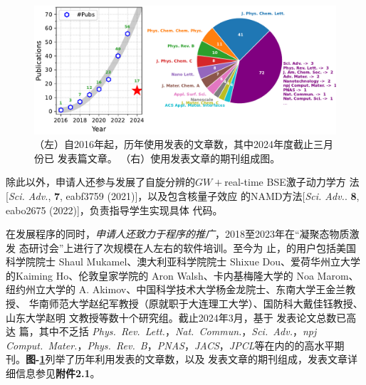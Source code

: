 
\begin{figure}
  \centering
  \includegraphics[width=1.0\linewidth]{figs/hefei-namd_pub_v3.pdf}
  \caption{\label{fig:hnamd_pub_list}
    \kaishu{}%
    （左）自2016年起，历年使用\hnamd{}发表的文章数，其中2024年度截止三月份已
    发表篇文章。
    （右）使用\hnamd{}发表文章的期刊组成图。
  }
\end{figure}


除此以外，申请人还参与发展了自旋分辨的$GW{}+{}$real-time BSE激子动力学方
法[\textit{Sci. Adv.}, \textbf{7}, eabf3759 (2021)]，以及包含核量子效应
的NAMD方法[\textit{Sci. Adv.}. \textbf{8}, eabo2675 (2022)]，负责指导学生实现具体
代码。

在发展程序的同时，\emph{申请人还致力于程序的推广}，2018至2023年在“凝聚态物质激发
态研讨会”上进行了次规模在人左右的软件培训。至今为
止，\hnamd{}的用户包括美国科学院院士 Shaul Mukamel、澳大利亚科学院院士 Shixue
Dou、爱荷华州立大学的Kaiming Ho、伦敦皇家学院的 Aron Walsh、卡内基梅隆大学的 Noa
Marom、纽约州立大学的 A. Akimov、中国科学技术大学杨金龙院士、东南大学王金兰教授、
华南师范大学赵纪军教授（原就职于大连理工大学）、国防科大戴佳钰教授、山东大学赵明
文教授等数十个研究组。截止2024年3月，基于 \hnamd{} 发表论文总数已高
达  篇，其中不乏括 \textit{Phys.\ Rev.\ Lett.}，\textit{Nat.\
  Commun.}，\textit{Sci.\ Adv.}，\textit{npj Comput.\ Mater.}，\textit{Phys.\
  Rev.\ B}，\textit{PNAS}，\textit{JACS}，\textit{JPCL}等在内的的高水平期
刊。\textbf{图-\ref{fig:hnamd_pub_list}}列举了历年利用\hnamd{}发表的文章数，以及
发表文章的期刊组成，发表文章详细信息参见\textbf{附件2.1}。
  

